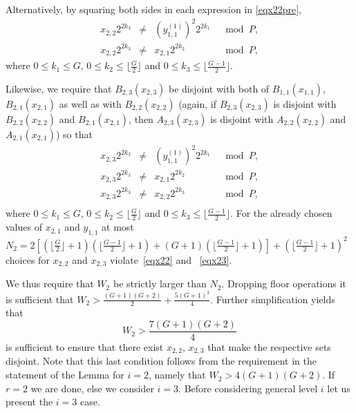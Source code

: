 \documentclass[12pt]{article} \pagestyle{plain} \topmargin
\begin{document}
Alternatively, by squaring both sides in each expression in
\eqref{eqx22pre},
\begin{equation}\label{eqx22}\begin{array}{cccc}
x_{2,2}2^{2k_3} &\neq& (y_{1,1}^{(1)})^2 2^{2k_1} &\mod P, \\
x_{2,2}2^{2k_3} &\neq& x_{2,1} 2^{2k_2} &\mod P,
\end{array}\end{equation}
where $0 \leq k_1 \leq G$, $0 \leq k_2 \leq \lfloor \frac{G}{2}
\rfloor$ and $0 \leq k_3 \leq \lfloor\frac{G-1}{2} \rfloor$.

Likewise, we require that $B_{2,3}(x_{2,3})$ be disjoint with both
 of  $B_{1,1}(x_{1,1})$, $B_{2,1}(x_{2,1})$ as well as with
$B_{2,2}(x_{2,2})$ (again, if $B_{2,3}(x_{2,3})$ is disjoint with
$B_{2,2}(x_{2,2})$ and $B_{2,1}(x_{2,1})$, then $A_{2,3}(x_{2,3})$
is disjoint with $A_{2,2}(x_{2,2})$ and $A_{2,1}(x_{2,1})$) so
that
\begin{equation}\label{eqx23}\begin{array}{cccc}
x_{2,3}2^{2k_3} &\neq& (y_{1,1}^{(1)})^2 2^{2k_1} &\mod P, \\
x_{2,3}2^{2k_3} &\neq& x_{2,1} 2^{2k_2} &\mod P, \\
x_{2,3}2^{2k_3} &\neq& x_{2,2} 2^{2k_3} &\mod P, \\
\end{array}\end{equation}
where $0 \leq k_1 \leq G$, $0 \leq k_2 \leq \lfloor \frac{G}{2}
\rfloor$ and $0 \leq k_3 \leq \lfloor\frac{G-1}{2} \rfloor$. For the
already chosen values of $x_{2,1}$ and $y_{1,1}$ at most $N_2=
2\left[ \left(\lfloor \frac{G}{2} \rfloor +1 \right)\left(\lfloor
\frac{G-1}{2} \rfloor +1 \right)+ \left( G+1 \right)\left(\lfloor
\frac{G-1}{2} \rfloor +1 \right)\right]+\left( \lfloor \frac{G-1}{2}
\rfloor +1 \right)^2  $ choices for $x_{2,2}$ and $x_{2,3}$
violate~\eqref{eqx22} and ~\eqref{eqx23}.

We thus require that $W_2$ be strictly larger than $N_2$. Dropping
floor operations it is sufficient that $W_2 > \frac{(G+1)(G+2)}{2}
+ \frac{5(G+1)^2}{4}$. Further  simplification yields that
\begin{equation}
W_2 > \frac{7(G+1)(G+2)}{4}
\end{equation}
is sufficient to ensure that there exist $x_{2,2}$, $x_{2,3}$ that
make the respective sets disjoint. Note that this last condition
follows from the requirement in the statement of the Lemma for
$i=2$, namely that $W_2 > 4(G+1)(G+2)$. If $r=2$ we are done, else
we consider $i=3$. Before considering general level $i$ let us
present the $i=3$ case.
\end{document}
